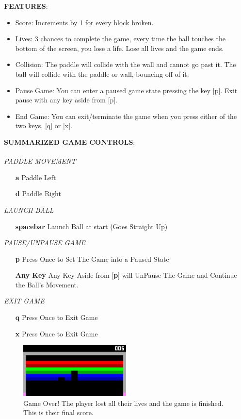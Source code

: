 \documentclass{article}
\begin{document}
\textbf{FEATURES}:
\begin{itemize}
    \item Score: Increments by 1 for every block broken. 
    \item Lives: 3 chances to complete the game, every time the ball touches the bottom of the screen, you lose a life. Lose all lives and the game ends.
    \item Collision: The paddle will collide with the wall and cannot go past it. The ball will collide with the paddle or wall, bouncing off of it.
    \item Pause Game: You can enter a paused game state pressing the key [p]. Exit pause with any key aside from [p].
    \item End Game: You can exit/terminate the game when you press either of the two keys, [q] or [x]. \\ 
\end{itemize}

\textbf{SUMMARIZED GAME CONTROLS}: \\ \\
    \textit{PADDLE MOVEMENT} 
    \begin{itemize}
        \item [\textbf{a}] Paddle Left
        \item [\textbf{d}] Paddle Right \\
    \end{itemize}

     \textit{LAUNCH BALL}
    \begin{itemize}
        \item [\textbf{spacebar}] Launch Ball at start (Goes Straight Up) \\
    \end{itemize}
    
    \textit{PAUSE/UNPAUSE GAME}
    \begin{itemize}
        \item [\textbf{p}] Press Once to Set The Game into a Paused State
        \item [\textbf{Any Key}] Any Key Aside from [\textbf{p}] will UnPause The Game and Continue the Ball's Movement. \\
    \end{itemize}
    
    \textit{EXIT GAME}
    \begin{itemize}
        \item [\textbf{q}] Press Once to Exit Game
        \item [\textbf{x}] Press Once to Exit Game \\
    \end{itemize}
    
\begin{figure}[ht!]
    \centering
    \includegraphics[width=0.5\textwidth]{gameplay2.png}
    \caption{Game Over! The player lost all their lives and the game is finished. This is their final score.}
    \label{f: Gameplay 2}
\end{figure}
\end{document}
